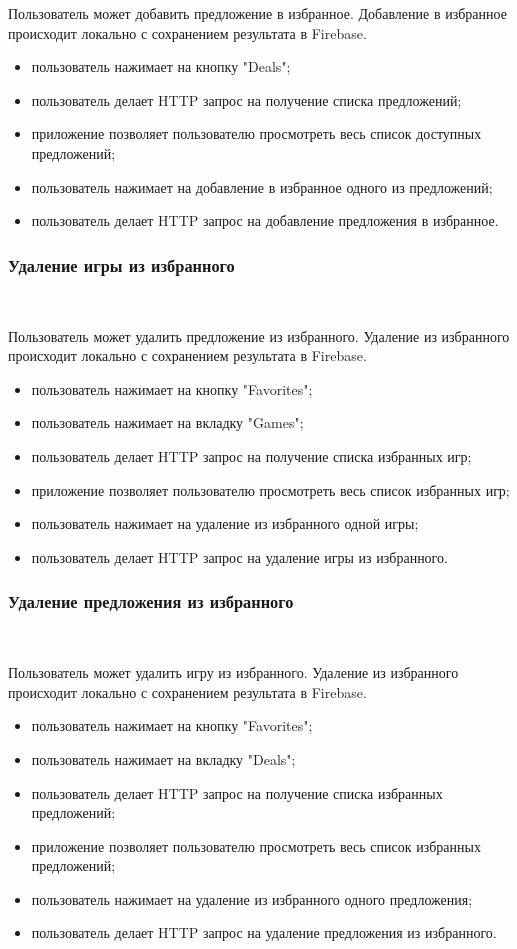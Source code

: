 Пользователь может добавить предложение в избранное. Добавление в избранное происходит локально с сохранением результата в Firebase.

\begin{itemize}
  \item пользователь нажимает на кнопку "Deals";
  \item пользователь делает HTTP запрос на получение списка предложений;
  \item приложение позволяет пользователю просмотреть весь список доступных предложений;
  \item пользователь нажимает на добавление в избранное одного из предложений;
  \item пользователь делает HTTP запрос на добавление предложения в избранное.
\end{itemize}


\subsubsection{Удаление игры из избранного}~\par
Пользователь может удалить предложение из избранного. Удаление из избранного происходит локально с сохранением результата в Firebase.

\begin{itemize}
  \item пользователь нажимает на кнопку "Favorites";
    \item пользователь нажимает на вкладку "Games";
  \item пользователь делает HTTP запрос на получение списка избранных игр;
  \item приложение позволяет пользователю просмотреть весь список избранных игр;
  \item пользователь нажимает на удаление из избранного одной игры;
  \item пользователь делает HTTP запрос на удаление игры из избранного.
\end{itemize}



\subsubsection{Удаление предложения из избранного}~\par
Пользователь может удалить игру из избранного. Удаление из избранного происходит локально с сохранением результата в Firebase.

\begin{itemize}
  \item пользователь нажимает на кнопку "Favorites";
  \item пользователь нажимает на вкладку "Deals";
  \item пользователь делает HTTP запрос на получение списка избранных предложений;
  \item приложение позволяет пользователю просмотреть весь список избранных предложений;
  \item пользователь нажимает на удаление из избранного одного предложения;
  \item пользователь делает HTTP запрос на удаление предложения из избранного.
\end{itemize}

